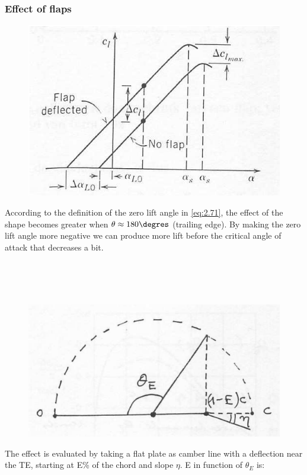\subsubsection{Effect of flaps}
	\begin{figure}
	\vspace{-5mm}
	\includegraphics[scale=0.3]{ch2/36}
	\end{figure}
	According to the definition of the zero lift angle in \eqref{eq:2.71}, the effect of the shape becomes greater when $\theta \approx 180\degres$ (trailing edge). By making the zero lift angle more negative we can produce more lift before the critical angle of attack that decreases a bit. 
	
	\ \\\\\\
	
	\begin{figure}
	\vspace{-5mm}
	\includegraphics[scale=0.2]{ch2/37}
	\end{figure}
	The effect is evaluated by taking a flat plate as camber line with a deflection near the TE, starting at E\% of the chord and slope $\eta$. E in function of $\theta _E$ is: 
	
